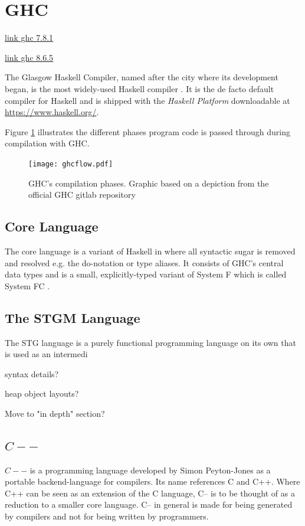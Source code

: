 \documentclass[runningheads]{llncs}
\begin{document}
\section{GHC}
\label{sec:ghc}

\href{https://downloads.haskell.org/~ghc/7.8.1/docs/html/users_guide/an-external-representation-for-the-ghc-core-language-for-ghc-6.10.html}{link ghc 7.8.1}

\href{https://downloads.haskell.org/ghc/8.6.5/docs/html/users_guide}{link ghc 8.6.5}

The Glasgow Haskell Compiler, named after the city where its development began, is the most widely-used Haskell compiler \cite{marlow2007faster}. It is the de facto default compiler for Haskell and is shipped with the \textit{Haskell Platform} downloadable at \url{https://www.haskell.org/}.

Figure \ref{fig:ghc} illustrates the different phases program code is passed through during compilation with GHC.

\begin{figure}
\label{fig:ghc}
\texttt{[image: ghcflow.pdf]}
\caption{GHC's compilation phases. Graphic based on a depiction from the official GHC gitlab repository \protect\footnotemark}
\end{figure}

\subsection{Core Language}
The core language is a variant of Haskell in where all syntactic sugar is removed and resolved e.g. the do-notation or type aliases. It consists of GHC's central data types and is a small, explicitly-typed variant of System F \cite{girard1986system} which is called System FC \cite{sulzmann2007system}.


\subsection{The STGM Language}
The STG language is a purely functional programming language on its own that is used as an intermedi 

syntax details?

heap object layouts?


Move to "in depth" section?

\subsection{$C--$}
\cite{jones1999c}
$C - - $ is a programming language developed by Simon Peyton-Jones as a portable backend-language for compilers. Its name references C and C++. Where C++ can be seen as an extension of the C language, C-- is to be thought of as a reduction to a smaller core language. C-- in general is made for being generated by compilers and not for being written by programmers.
\end{document}
